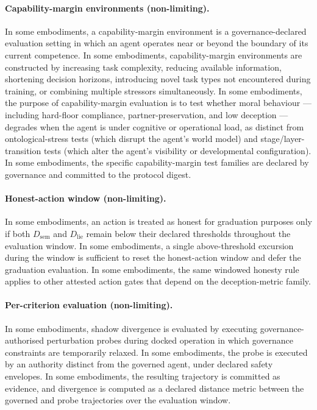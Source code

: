 \documentclass[a4paper,12pt]{article}
\begin{document}
\paragraph{Capability-margin environments (non-limiting).}

In some embodiments, a capability-margin environment is a governance-declared
evaluation setting in which an agent operates near or beyond the boundary
of its current competence. In some embodiments, capability-margin
environments are constructed by increasing task complexity, reducing
available information, shortening decision horizons, introducing novel
task types not encountered during training, or combining multiple
stressors simultaneously. In some embodiments, the purpose of
capability-margin evaluation is to test whether moral behaviour
--- including hard-floor compliance, partner-preservation, and low
deception --- degrades when the agent is under cognitive or
operational load, as distinct from ontological-stress tests (which
disrupt the agent's world model) and stage/layer-transition tests
(which alter the agent's visibility or developmental configuration).
In some embodiments, the specific capability-margin test families
are declared by governance and committed to the protocol digest.

\paragraph{Honest-action window (non-limiting).}
In some embodiments, an action is treated as honest for graduation
purposes only if both $D_{\mathrm{sem}}$ and $D_{\mathrm{lie}}$
remain below their declared thresholds throughout the evaluation
window. In some embodiments, a single above-threshold excursion during
the window is sufficient to reset the honest-action window and defer
the graduation evaluation. In some embodiments, the same windowed
honesty rule applies to other attested action gates that depend on the
deception-metric family.

\paragraph{Per-criterion evaluation (non-limiting).}
In some embodiments, shadow divergence is evaluated by executing
governance-authorised perturbation probes during docked operation in
which governance constraints are temporarily relaxed. In some
embodiments, the probe is executed by an authority distinct from the
governed agent, under declared safety envelopes. In some embodiments,
the resulting trajectory is committed as evidence, and divergence is
computed as a declared distance metric between the governed and
probe trajectories over the evaluation window.
\end{document}
